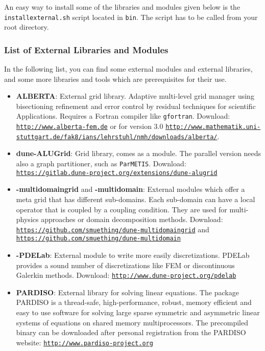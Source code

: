 An easy way to install some of the libraries and modules given below is the
\texttt{installexternal.sh} script located in \texttt{bin}. The script
has to be called from your {\Dune} root directory.


\subsubsection{List of External Libraries and Modules}
In the following list, you can find some external modules and external libraries,
and some more libraries and tools which are prerequisites for their use.

\begin{itemize}
\item \textbf{ALBERTA}: External grid library. Adaptive multi-level grid manager using bisectioning
  refinement and error control by residual techniques for scientific Applications. Requires a Fortran
  compiler like \texttt{gfortran}. Download: \texttt{\url{http://www.alberta-fem.de}} or for version 3.0
  \texttt{\url{http://www.mathematik.uni-stuttgart.de/fak8/ians/lehrstuhl/nmh/downloads/alberta/}}.

\item \textbf{dune-ALUGrid}: Grid library, comes as a \Dune module.
  The parallel version needs also a graph partitioner, such as \texttt{ParMETIS}.
  Download: \texttt{\url{https://gitlab.dune-project.org/extensions/dune-alugrid}}

\item \textbf{\Dune-multidomaingrid} and \textbf{\Dune-multidomain}: External modules which offer a meta grid that
  has different sub-domains. Each sub-domain can have a local operator that is coupled by a coupling condition. They are
  used for multi-physics approaches or domain decomposition methods. Download:
  \texttt{\url{https://github.com/smuething/dune-multidomaingrid}}
  and \texttt{\url{https://github.com/smuething/dune-multidomain}}

\item \textbf{\Dune-PDELab}: External module to write more easily discretizations. PDELab provides
  a sound number of discretizations like FEM or discontinuous Galerkin methods.
  Download: \texttt{\url{http://www.dune-project.org/pdelab}}

\item \textbf{PARDISO}: External library for solving linear equations. The package PARDISO is a thread-safe,
  high-performance, robust, memory efficient and easy to use software for solving large sparse symmetric
  and asymmetric linear systems of equations on shared memory multiprocessors. The precompiled binary
  can be downloaded after personal registration from the PARDISO website: \texttt{\url{http://www.pardiso-project.org}}


\end{itemize}
